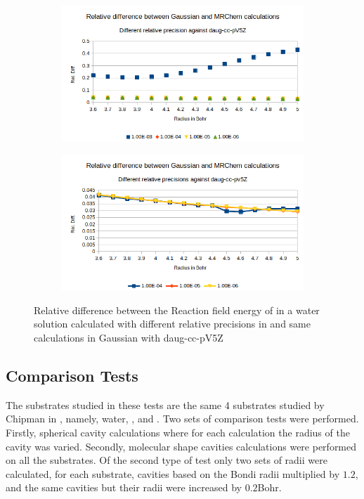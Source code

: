 \documentclass[../master_thesis.tex]{subfiles}
\begin{document}
\begin{figure}[!htb]
  \centering
  \begin{subfigure}[b]{0.75\linewidth}
    \includegraphics[width=\linewidth]{img/lipprecallreldiff.png}
  \end{subfigure}
  \begin{subfigure}[b]{0.75\linewidth}
    \includegraphics[width=\linewidth]{img/lipprecallreldiffexcl.png}
  \end{subfigure}
  \caption{Relative difference between the Reaction field energy of  in a water solution calculated with different relative precisions in \mrchem  and same calculations in Gaussian with daug-cc-pV5Z}
  \label{fig:lipprecreldef}
\end{figure}
\clearpage

\subsection{Comparison Tests}
The substrates studied in these tests are the same 4 substrates studied by Chipman in \cite{Chipman2002},
namely, water, ,  and . Two sets of comparison tests
were performed. Firstly, spherical cavity calculations where for each calculation the radius of the
cavity was varied. Secondly, molecular shape cavities calculations were performed on
all the substrates. Of the second type of test only two sets of radii were calculated, for
each substrate, cavities based on the Bondi radii multiplied by $1.2$, and the same cavities
but their radii were increased by $0.2$Bohr.
\end{document}
